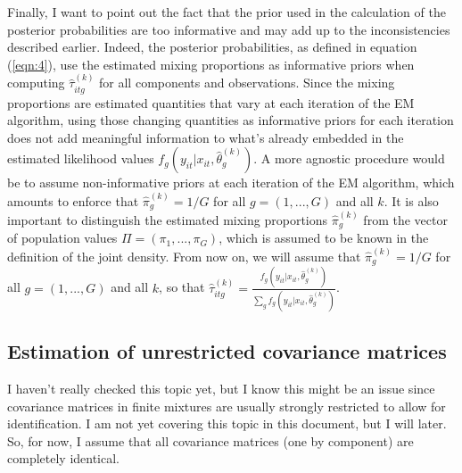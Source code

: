 \documentclass[11pt,letter]{article}
\begin{document}
Finally, I want to point out the fact that the prior used in the calculation of the posterior probabilities are too informative and may add up to the inconsistencies described earlier. Indeed, the posterior probabilities, as defined in equation (\ref{eqn:4}), use the estimated mixing proportions as informative priors when computing $\hat{\tau}^{(k)}_{itg}$ for all components and observations. Since the mixing proportions are estimated quantities that vary at each iteration of the EM algorithm, using those changing quantities as informative priors for each iteration does not add meaningful information to what's already embedded in the estimated likelihood values $f_g(y_{it}|x_{it},\hat{\theta}_{g}^{(k)})$. A more agnostic procedure would be to assume non-informative priors at each iteration of the EM algorithm, which amounts to enforce that $\hat{\pi}_{g}^{(k)} = 1/G$ for all $g = (1,...,G)$ and all $k$. It is also important to distinguish the estimated mixing proportions $\hat{\pi}_{g}^{(k)}$ from the vector of population values $\Pi = (\pi_1,...,\pi_G)$, which is assumed to be known in the definition of the joint density. From now on, we will assume that $\hat{\pi}_{g}^{(k)} = 1/G$ for all $g = (1,...,G)$ and all $k$, so that $\hat{\tau}^{(k)}_{itg} = \frac{f_g(y_{it}|x_{it},\hat{\theta}_{g}^{(k)})}{\sum_g f_g(y_{it}|x_{it},\hat{\theta}_{g}^{(k)})}$.
\subsection{Estimation of unrestricted covariance matrices}
I haven't really checked this topic yet, but I know this might be an issue since covariance matrices in finite mixtures are usually strongly restricted to allow for identification. I am not yet covering this topic in this document, but I will later. So, for now, I assume that all covariance matrices (one by component) are completely identical.
\end{document}
